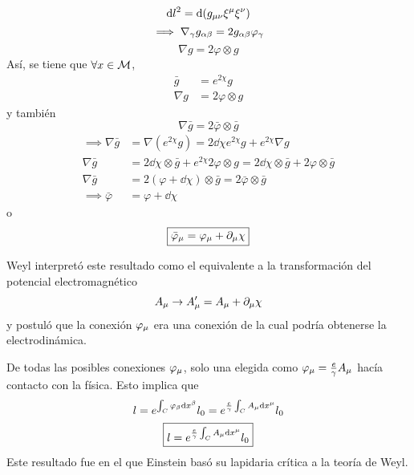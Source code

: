 \begin{equation}
  \dd l^2=\dd (g_{\mu\nu }\xi^\mu\xi^\nu )
\end{equation}
\begin{equation}
  \implies \nabla_\gamma g_{\alpha\beta }=2g_{\alpha\beta }\varphi_\gamma 
\end{equation}
\begin{equation}
\boxed{  \nabla g=2\varphi\otimes g}
\end{equation}
Así, se tiene que $\forall x\in\mathcal{M} $,
\begin{align}
  \bar{g}&=e^{2\chi }g\\
  \nabla g&=2\varphi\otimes g
\end{align}
y también
\begin{equation}
  \nabla \bar{g}=2\bar{\varphi}\otimes \bar{g}
\end{equation}
\begin{align}
  \implies \nabla\bar{g}&=\nabla(e^{2\chi }g)=2\dd\chi e^{2\chi }g+e^{2\chi }\nabla g\\
  \nabla \bar{g}&=2\dd\chi\otimes\bar{g}+e^{2\chi }2\varphi\otimes g=2\dd \chi \otimes\bar{g}+2\varphi\otimes \bar{g}\\
  \nabla\bar{g}&=2(\varphi+\dd\chi )\otimes\bar{g}=2\bar{\varphi}\otimes\bar{g}\\
  \implies \bar{\varphi}&=\varphi+\dd\chi 
\end{align}
o
\begin{equation}
\boxed{  \bar{\varphi}_\mu =\varphi_\mu +\partial_\mu \chi }
\end{equation}

Weyl interpretó este resultado como el equivalente a la transformación del potencial electromagnético
\begin{equation}
  A_\mu \to A'_\mu =A_\mu +\partial_\mu \chi 
\end{equation}
y postuló que la conexión $\varphi_\mu$ era una conexión de la cual podría obtenerse la electrodinámica.

De todas las posibles conexiones $\varphi_\mu$, solo una elegida como $\varphi_\mu =\frac{e}{\gamma }A_\mu$ hacía contacto con la física. Esto implica que
\begin{equation}
  l=e^{\int_C\varphi_\beta \dd x^\beta }l_0=e^{\frac{e}{\gamma }\int_C A_\mu\dd x^\mu }l_0
\end{equation}
\begin{equation}
   \boxed{l=e^{\frac{e}{\gamma }\int_C A_\mu\dd x^\mu }l_0}
\end{equation}
Este resultado fue en el que Einstein basó su lapidaria crítica a la teoría de Weyl.

